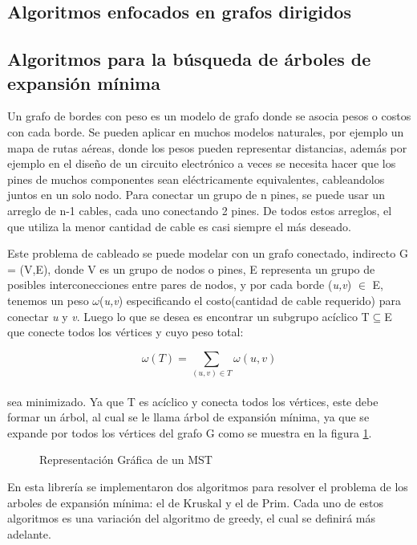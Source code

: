 \documentclass[a4paper, 11pt]{report}
\newcommand{\DrawEJGraph}[5]{

    \begin{scope}[#4]
    \foreach \pos/\nodo in {{(0,0)/4}, {(0,2.2)/5}, {(1.5,1.7)/7}, {(3,3)/1}, {(3,1)/0}, {(4.5,1.7)/2}, {(4.5,3)/3}, {(7,0)/6}}
        \node[vertex] (#3\nodo) at \pos {\nodo};

    \foreach \start/\end/\weight in {4/5/0.35, 5/7/0.28, 7/1/0.19,7/0/0.16,0/2/0.26,2/3/0.17,2/6/0.40,4/7/0.37,1/5/0.32,0/4/0.38,1/2/0.36,1/3/0.29,2/7/0.34,3/6/0.52,6/0/0.58,6/4/0.93}
        \path[edge,#5] (#3\start) --node[weight,midway,fill=white] {$\weight$} (#3\end);

    \foreach \nodo in {#1}
        \node[selected vertex] at (#3\nodo) {\nodo};

    \begin{pgfonlayer}{background}
        \foreach \start/\end in {#2}
            \path[rojog edge,#5] (#3\start) -- (#3\end);
    \end{pgfonlayer}
    \end{scope}

}
\begin{document}
\subsection{Algoritmos enfocados en grafos dirigidos}
\newpage
\subsection{Algoritmos para la b\'usqueda de \'arboles de expansi\'on m\'inima}
Un grafo de bordes con peso es un modelo de grafo donde se asocia pesos o costos con cada borde. Se pueden aplicar en muchos modelos naturales, por ejemplo un mapa de rutas aéreas, donde los pesos pueden representar distancias, además por ejemplo en el diseño de un circuito electrónico a veces se necesita hacer que los pines de muchos componentes sean eléctricamente equivalentes, cableandolos juntos en un solo nodo. Para conectar un grupo de n pines, se puede usar un arreglo de n-1 cables, cada uno conectando 2 pines. De todos estos arreglos, el que utiliza la menor cantidad de cable es casi siempre el más deseado. 

Este problema de cableado se puede modelar con un grafo conectado, indirecto G = (V,E), donde V es un grupo de nodos o pines, E representa un grupo de posibles interconecciones entre pares de nodos, y por cada borde (\textit{u,v}) $\in$  E, tenemos un peso $\omega$(\textit{u,v}) especificando el costo(cantidad de cable requerido) para conectar \textit{u} y \textit{v}. Luego lo que se desea es encontrar un subgrupo acíclico T$ \subseteq $E que conecte todos los vértices y cuyo peso total:

\begin{equation}
 \omega (T) =  \sum_{(u,v) \in T}  \omega (u,v) 
\end{equation}
\\
sea minimizado. Ya que T es acíclico y conecta todos los vértices, este debe formar un árbol, al cual se le llama árbol de expansión mínima, ya que se expande por todos los vértices del grafo G como se muestra en la figura \ref{MST1}. 


\begin{figure}[!h]
    \centering
    \caption{Representaci\'on Gr\'afica de un MST}
    \label{MST1}
\end{figure}

En esta librería se implementaron dos algoritmos para resolver el problema de los arboles de expansión mínima: el de Kruskal y el de Prim. Cada uno de estos algoritmos es una variación del algoritmo de greedy, el cual se definirá más adelante. 
\end{document}

